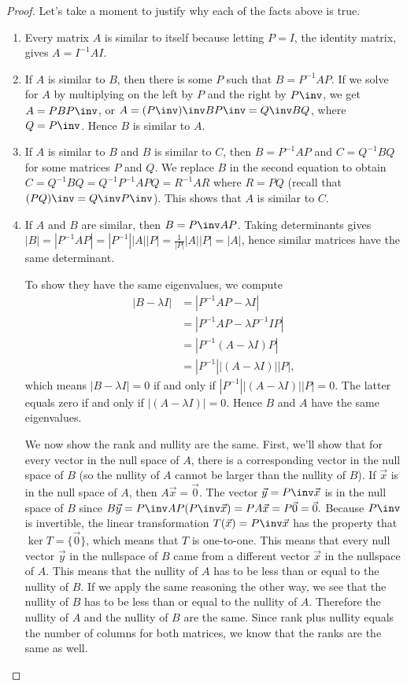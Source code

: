 \begin{proof} Let's take a moment to justify why each of the facts above is true.  
\begin{enumerate}
	\item Every matrix $A$ is similar to itself because letting $P=I$, the identity matrix, gives $A=I^{-1}AI$. 
	\item If $A$ is similar to $B$, then there is some $P$ such that $B=P^{-1}AP$.  If we solve for $A$ by multiplying on the left by $P$ and the right by $P\inv$, we get $A=PBP\inv$, or $A=(P\inv)\inv B P\inv=Q\inv B Q$, where $Q=P\inv$. Hence $B$ is similar to $A$.  
	\item If $A$ is similar to $B$ and $B$ is similar to $C$, then $B=P^{-1}AP$ and $C=Q^{-1}BQ$ for some matrices $P$ and $Q$.  We replace $B$ in the second equation to obtain $C=Q^{-1}BQ = Q^{-1}P^{-1}APQ = R^{-1}AR$ where $R=PQ$ (recall that $(PQ)\inv=Q\inv P\inv$). This shows that $A$ is similar to $C$.
	\item If $A$ and $B$ are similar, then $B=P\inv A P$. Taking determinants gives $|B|=|P^{-1}AP| = |P^{-1}||A||P| = \frac{1}{|P|}|A||P| =|A|$, hence similar matrices have the same determinant. 
          
          To show they have the same eigenvalues, we compute 
          \begin{align*}
            |B-\lambda I|&=|P^{-1}AP-\lambda I|\\
            &=|P^{-1}AP-\lambda P^{-1}IP|\\
            &=|P^{-1}(A-\lambda I)P|\\
            &=|P^{-1}||(A-\lambda I)||P|,
          \end{align*} 
          which means $|B-\lambda I| = 0 $ if and only if $|P^{-1}||(A-\lambda I)||P|=0$. The latter equals zero if and only if $|(A-\lambda I)|=0$. Hence $B$ and $A$ have the same eigenvalues.
          
          We now show the rank and nullity are the same. First, we'll show that for every vector in the null space of $A$, there is a corresponding vector in the null space of $B$ (so the nullity of $A$ cannot be larger than the nullity of $B$).  If $\vec x$ is in the null space of $A$, then $A\vec x = \vec 0$.  The vector $\vec y = P\inv \vec x$ is in the null space of $B$ since $B\vec y = P\inv A P (P\inv \vec x) = P A \vec x = P\vec 0 = \vec 0.$ Because $P\inv$ is invertible, the linear transformation $T(\vec x)=P\inv \vec x$ has the property that $\ker T=\{\vec 0\}$, which means that $T$ is one-to-one.  This means that every null vector $\vec y$ in the nullspace of $B$ came from a different vector $\vec x$ in the nullspace of $A$.  This means that the nullity of $A$ has to be less than or equal to the nullity of $B$.  If we apply the same reasoning the other way, we see that the nullity of $B$ has to be less than or equal to the nullity of $A$.  Therefore the nullity of $A$ and the nullity of $B$ are the same.  Since rank plus nullity equals the number of columns for both matrices, we know that the ranks are the same as well.  
        \end{enumerate} 
      \end{proof}

